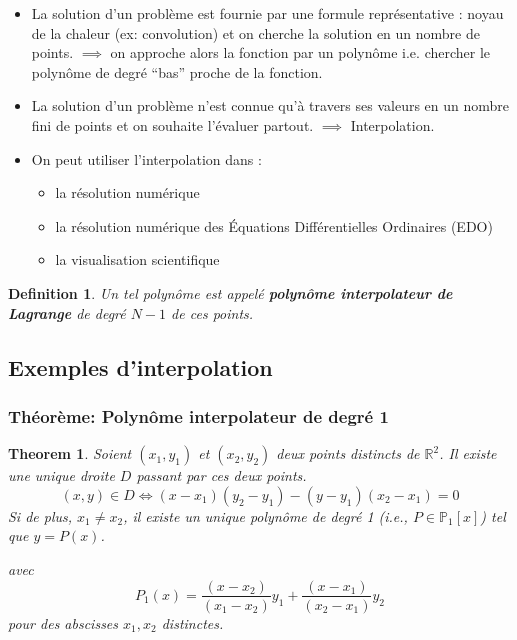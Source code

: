 \documentclass{article}
\newtheorem{theorem}{Theorem}
\newtheorem{definition}{Definition}
\begin{document}
\begin{itemize}
    \item La solution d'un problème est fournie par une formule représentative : noyau de la chaleur (ex: convolution) et on cherche la solution en un nombre de points.
    $\implies$ on approche alors la fonction par un polynôme i.e. chercher le polynôme de degré ``bas'' proche de la fonction.
    \item La solution d'un problème n'est connue qu'à travers ses valeurs en un nombre fini de points et on souhaite l'évaluer partout.
    $\implies$ Interpolation.
    \item On peut utiliser l'interpolation dans :
    \begin{itemize}
        \item la résolution numérique
        \item la résolution numérique des Équations Différentielles Ordinaires (EDO)
        \item la visualisation scientifique
    \end{itemize}
\end{itemize}

\begin{definition}
Un tel polynôme est appelé \textbf{polynôme interpolateur de Lagrange} de degré $N-1$ de ces points.
\end{definition}

\subsection{Exemples d'interpolation}

\subsubsection{Théorème: Polynôme interpolateur de degré 1}

\begin{theorem}
Soient $(x_1, y_1)$ et $(x_2, y_2)$ deux points distincts de $\mathbb{R}^2$.
Il existe une unique droite $D$ passant par ces deux points.
\[
(x, y) \in D \iff (x-x_1)(y_2-y_1) - (y-y_1)(x_2-x_1) = 0
\]
Si de plus, $x_1 \neq x_2$, il existe un unique polynôme de degré 1 (i.e., $P \in \mathbb{P}_1[x]$) tel que $y = P(x)$.

avec
\[
P_1(x) = \frac{(x-x_2)}{(x_1-x_2)} y_1 + \frac{(x-x_1)}{(x_2-x_1)} y_2
\]
pour des abscisses $x_1, x_2$ distinctes.
\end{theorem}
\end{document}
